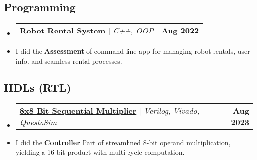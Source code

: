 \documentclass[letterpaper,11pt]{article}
\makeatletter
\newcommand{\resumeItem}[1]{
  \item\small{
    {#1 \vspace{-2pt}}
  }
}
\newcommand{\resumeProjectHeading}[2]{
    \item
    \begin{tabular*}{1.001\textwidth}{l@{\extracolsep{\fill}}r}
      \small#1 & \textbf{\small #2}\\
    \end{tabular*}\vspace{-7pt}
}
\newcommand{\resumeSubHeadingListStart}{\begin{itemize}[leftmargin=0.0in, label={}]}
\newcommand{\resumeSubHeadingListEnd}{\end{itemize}}
\makeatother
\begin{document}
    \subsection{Programming} \vspace{-20pt}
    \resumeSubHeadingListStart
      \resumeProjectHeading
          {\textbf{\href{https://github.com/islamibr/robot_rental_system}{Robot Rental System}} $|$ \emph{C++, OOP}}{Aug 2022}
          \resumeItem{I did the \textbf{Assessment} of command-line app for managing robot rentals, user info, and seamless rental processes.}
    \resumeSubHeadingListEnd \vspace{-15pt}
    \subsection{HDLs (RTL)} \vspace{-20pt}
    \resumeSubHeadingListStart
      \resumeProjectHeading
          {\textbf{\href{https://github.com/islamibr/8x8_seq_mult}{8x8 Bit Sequential Multiplier}} $|$ \emph{Verilog, Vivado, QuestaSim}}{Aug 2023}
          \resumeItem{I did the \textbf{Controller} Part of streamlined 8-bit operand multiplication, yielding a 16-bit product with multi-cycle computation.}
    \resumeSubHeadingListEnd
\vspace{-30pt}


%
\end{document}
